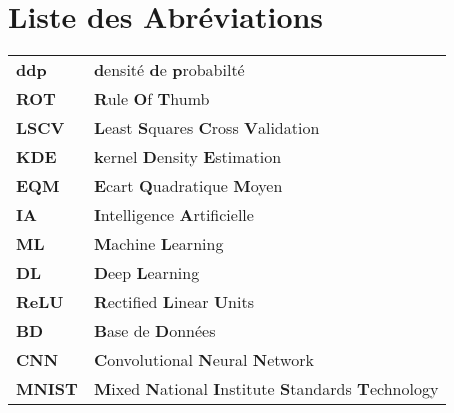 \chapter*{Liste des Abréviations}





\begin{tabular}{ll}
\textbf{ddp} &  \textbf{d}ensité  \textbf{d}e \textbf{p}robabilté\\
\textbf{ROT} & \textbf{R}ule \textbf{O}f  \textbf{T}humb \\
\textbf{LSCV} &  \textbf{L}east   \textbf{S}quares   \textbf{C}ross \textbf{V}alidation \\
\textbf{KDE} &  \textbf{k}ernel  \textbf{D}ensity \textbf{E}stimation \\
\textbf{EQM} & \textbf{E}cart \textbf{Q}uadratique  \textbf{M}oyen \\
\textbf{IA} &  \textbf{I}ntelligence  \textbf{A}rtificielle \\
\textbf{ML} &  \textbf{M}achine  \textbf{L}earning \\
\textbf{DL} &  \textbf{D}eep  \textbf{L}earning \\
\textbf{ReLU} &  \textbf{R}ectified  \textbf{L}inear \textbf{U}nits \\
\textbf{BD} &  \textbf{B}ase de \textbf{D}onnées \\
\textbf{CNN} &  \textbf{C}onvolutional   \textbf{N}eural \textbf{N}etwork \\
\textbf{MNIST} &  \textbf{M}ixed \textbf{N}ational \textbf{I}nstitute \textbf{S}tandards \textbf{T}echnology \\
\end{tabular}











